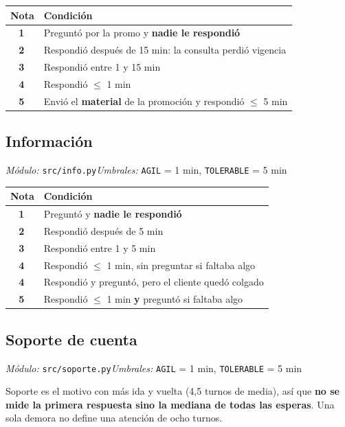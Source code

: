 \documentclass[11pt,a4paper]{article}
\newcommand{\cod}[1]{\texttt{\small #1}}
\newcommand{\est}[1]{\textbf{#1}\,\raisebox{0.5pt}{$\star$}}
\begin{document}
\begin{center}
\begin{tabularx}{\textwidth}{@{}cX@{}}
\toprule
\textbf{Nota} & \textbf{Condición} \\
\midrule
\est{1} & Preguntó por la promo y \textbf{nadie le respondió} \\
\est{2} & Respondió después de 15 min: la consulta perdió vigencia \\
\est{3} & Respondió entre 1 y 15 min \\
\est{4} & Respondió $\le$ 1 min \\
\est{5} & Envió el \textbf{material} de la promoción y respondió $\le$ 5 min \\
\bottomrule
\end{tabularx}
\end{center}

\subsection{Información}
\emph{Módulo:} \cod{src/info.py}\quad\emph{Umbrales:} \cod{AGIL} = 1 min,
\cod{TOLERABLE} = 5 min

\begin{center}
\begin{tabularx}{\textwidth}{@{}cX@{}}
\toprule
\textbf{Nota} & \textbf{Condición} \\
\midrule
\est{1} & Preguntó y \textbf{nadie le respondió} \\
\est{2} & Respondió después de 5 min \\
\est{3} & Respondió entre 1 y 5 min \\
\est{4} & Respondió $\le$ 1 min, sin preguntar si faltaba algo \\
\est{4} & Respondió y preguntó, pero el cliente quedó colgado \\
\est{5} & Respondió $\le$ 1 min \textbf{y} preguntó si faltaba algo \\
\bottomrule
\end{tabularx}
\end{center}

\subsection{Soporte de cuenta}
\emph{Módulo:} \cod{src/soporte.py}\quad\emph{Umbrales:} \cod{AGIL} = 1 min,
\cod{TOLERABLE} = 5 min

Soporte es el motivo con más ida y vuelta (4,5 turnos de media), así que \textbf{no
se mide la primera respuesta sino la mediana de todas las esperas}. Una sola demora
no define una atención de ocho turnos.
\end{document}
